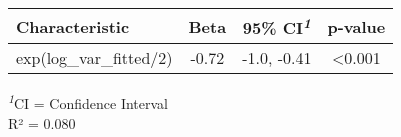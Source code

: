 
\fontsize{12.0pt}{14.4pt}\selectfont
\begin{tabular*}{\linewidth}{@{\extracolsep{\fill}}lccc}
\toprule
\textbf{Characteristic} & \textbf{Beta} & \textbf{95\% CI}\textsuperscript{\textit{1}} & \textbf{p-value} \\ 
\midrule\addlinespace[2.5pt]
exp(log\_var\_fitted/2) & -0.72 & -1.0, -0.41 & <0.001 \\ 
\bottomrule
\end{tabular*}
\begin{minipage}{\linewidth}
\textsuperscript{\textit{1}}CI = Confidence Interval\\
R² = 0.080\\
\end{minipage}


